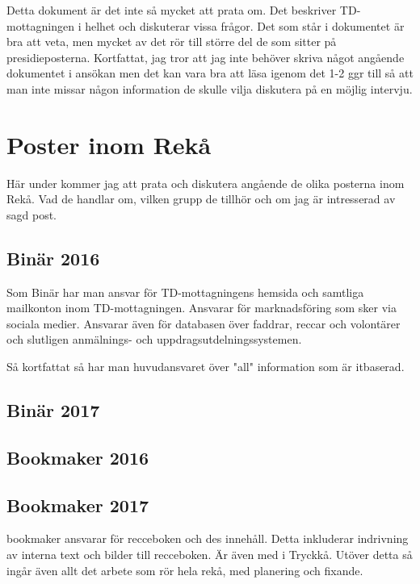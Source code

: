 \documentclass[a4paper]{article}
\begin{document}
Detta dokument är det inte så mycket att prata om. Det 
beskriver TD-mottagningen i helhet och diskuterar 
vissa frågor. Det som står i dokumentet är bra att 
veta, men mycket av det rör till större del de som 
sitter på presidieposterna. Kortfattat, jag tror att 
jag inte behöver skriva något angående dokumentet i 
ansökan men det kan vara bra att läsa igenom det 1-2 
ggr till så att man inte missar någon information de 
skulle vilja diskutera på en möjlig intervju.

\section{Poster inom Rekå}

Här under kommer jag att prata och diskutera angående 
de olika posterna inom Rekå. Vad de handlar om, vilken 
grupp de tillhör och om jag är intresserad av sagd 
post.

\subsection{Binär 2016}

Som Binär har man ansvar för TD-mottagningens hemsida 
och samtliga mailkonton inom TD-mottagningen. Ansvarar 
för marknadsföring som sker via sociala medier. 
Ansvarar även för databasen över faddrar, reccar och 
volontärer och slutligen anmälnings- och 
uppdragsutdelningssystemen. 

Så kortfattat så har man huvudansvaret över "all" 
information som är itbaserad. 

\subsection{Binär 2017}



\subsection{Bookmaker 2016}



\subsection{Bookmaker 2017}

bookmaker ansvarar för recceboken och des innehåll. 
Detta inkluderar indrivning av interna text och bilder 
till recceboken. Är även med i Tryckkå. Utöver detta 
så ingår även allt det arbete som rör hela rekå, med 
planering och fixande.
\end{document}
